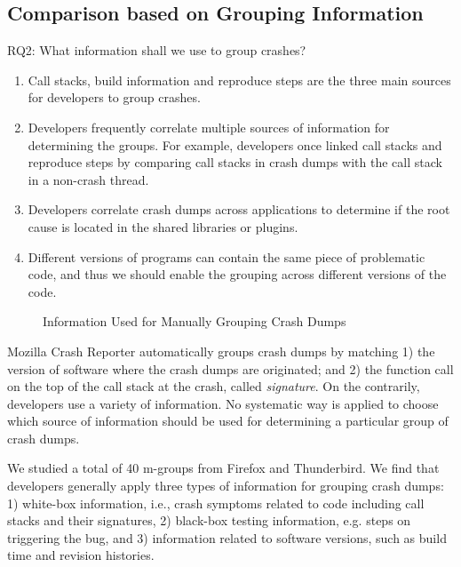 \subsection{Comparison based on Grouping Information}

RQ2: What information shall we use to group crashes?
\begin{enumerate}
\item Call stacks, build information and reproduce steps are the three main sources for developers to group crashes.
\item Developers frequently correlate multiple sources of information for determining the groups. For example, developers once linked call stacks and reproduce steps by comparing call stacks in crash dumps with the call stack in a non-crash thread.
\item Developers correlate crash dumps across applications to determine if the root cause is located in the shared libraries or plugins.
\item Different versions of programs can contain the same piece of problematic code, and thus we should enable the grouping across different versions of the code.
\end{enumerate}


\begin{figure*}
\caption{Information Used for Manually Grouping Crash Dumps~\label{fig:stack}}
\end{figure*}

Mozilla Crash Reporter automatically groups crash dumps by matching 1) the version of software where the crash dumps are originated; and 2) the function call on the top of the call stack at the crash, called {\it signature}. On the contrarily, developers use a variety of information. No systematic way is applied to choose which source of information should be used for determining a particular group of crash dumps.

We studied a total of 40 m-groups from Firefox and Thunderbird. We find that developers generally apply three types of information for grouping crash dumps: 1) white-box information, i.e., crash symptoms related to code including call stacks and their signatures, 2) black-box testing information, e.g. steps on triggering the bug, and 3) information related to software versions, such as build time and revision histories. 

